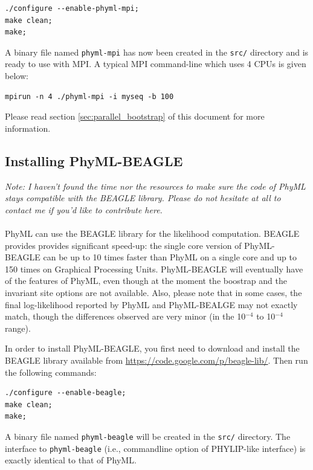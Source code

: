 \documentclass[a4paper,12pt]{article}
\newcommand{\x}[1]{\texttt{#1}}
\begin{document}
{\setlength{\baselineskip}{0.5\baselineskip}
\begin{verbatim}
./configure --enable-phyml-mpi;
make clean;
make;
\end{verbatim}
}

A binary file named \x{phyml-mpi} has now been created in the \x{src/} directory and is ready to use
with MPI. A typical MPI command-line which uses 4 CPUs is given below:

{\setlength{\baselineskip}{0.5\baselineskip}
\begin{verbatim}
mpirun -n 4 ./phyml-mpi -i myseq -b 100
\end{verbatim}
}

\noindent Please read section \ref{sec:parallel_bootstrap} of this document for more information.

\subsection{Installing PhyML-BEAGLE}\label{sec:install-phyml-beagle}

{\em Note: I haven't found the time nor the resources to make sure the code of PhyML stays
  compatible with the BEAGLE library. Please do not hesitate at all to contact me if you'd
  like to contribute here.}
\\
\\
PhyML  can use  the  BEAGLE\cite{ayres12}  library for  the  likelihood computation.  BEAGLE
provides provides  significant speed-up: the  single core  version of PhyML-BEAGLE  can be up  to 10
times  faster  than  PhyML  on  a  single   core  and  up  to  150  times  on  Graphical  Processing
Units. PhyML-BEAGLE  will eventually have of  the features of PhyML,  even though at  the moment the
boostrap and the invariant site options are not available. Also, please note that in some cases, the
final  log-likelihood  reported  by  PhyML  and  PhyML-BEALGE may  not  exactly  match,  though  the
differences observed are very minor (in the 10$^{-4}$ to 10$^{-4}$ range).

In  order to  install  PhyML-BEAGLE, you  first  need to  download and  install  the BEAGLE  library
available from \url{https://code.google.com/p/beagle-lib/}.  Then run the following commands:

{\setlength{\baselineskip}{0.5\baselineskip}
\begin{verbatim}
./configure --enable-beagle;
make clean;
make;
\end{verbatim} } A binary file named \x{phyml-beagle} will be created in the \x{src/} directory. The
interface  to  \x{phyml-beagle} (i.e.,  commandline  option  of  PHYLIP-like interface)  is  exactly
identical to that of PhyML.
\end{document}
